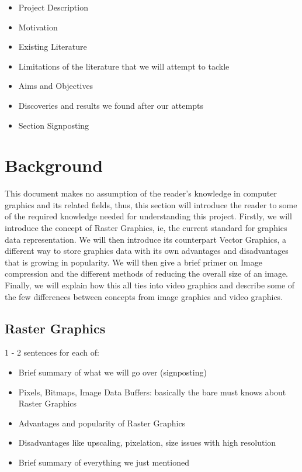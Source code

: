 \documentclass[12pt]{article}
\begin{document}
    \begin{itemize}
        \item Project Description
        \item Motivation
        \item Existing Literature
        \item Limitations of the literature that we will attempt to tackle
        \item Aims and Objectives
        \item Discoveries and results we found after our attempts
        \item Section Signposting
    \end{itemize}

    \pagebreak


    \section{Background}

    \tab This document makes no assumption of the reader's knowledge in computer graphics and its related fields,
    thus, this section will introduce the reader to some of the required knowledge needed for understanding this
    project. Firstly, we will introduce the concept of Raster Graphics, ie, the current standard for graphics data
    representation. We will then introduce its counterpart Vector Graphics, a different way to store graphics data
    with its own advantages and disadvantages that is growing in popularity. We will then give a brief primer on
    Image compression and the different methods of reducing the overall size of an image. Finally, we will explain
    how this all ties into video graphics and describe some of the few differences between concepts from image
    graphics and video graphics.

    \subsection{Raster Graphics}

    1 - 2 sentences for each of:

    \begin{itemize}
        \item Brief summary of what we will go over (signposting)
        \item Pixels, Bitmaps, Image Data Buffers: basically the bare must knows about Raster Graphics
        \item Advantages and popularity of Raster Graphics
        \item Disadvantages like upscaling, pixelation, size issues with high resolution
        \item Brief summary of everything we just mentioned
    \end{itemize}
\end{document}
